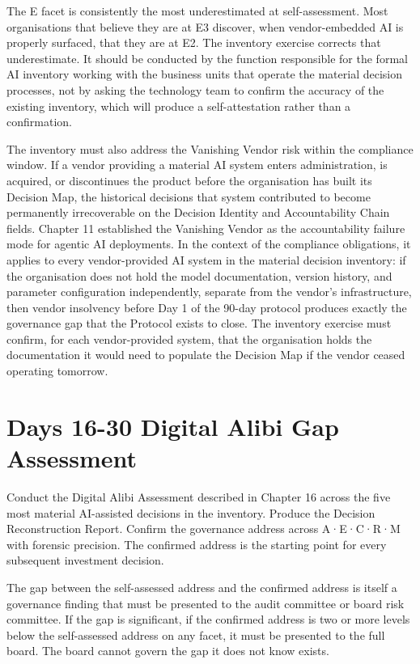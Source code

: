 The E facet is consistently the most underestimated at self-assessment. Most organisations that believe they are at E3 discover, when vendor-embedded AI is properly surfaced, that they are at E2. The inventory exercise corrects that underestimate. It should be conducted by the function responsible for the formal AI inventory working with the business units that operate the material decision processes, not by asking the technology team to confirm the accuracy of the existing inventory, which will produce a self-attestation rather than a confirmation.

The inventory must also address the Vanishing Vendor risk within the compliance window. If a vendor providing a material AI system enters administration, is acquired, or discontinues the product before the organisation has built its Decision Map, the historical decisions that system contributed to become permanently irrecoverable on the Decision Identity and Accountability Chain fields. Chapter 11 established the Vanishing Vendor as the accountability failure mode for agentic AI deployments. In the context of the compliance obligations, it applies to every vendor-provided AI system in the material decision inventory: if the organisation does not hold the model documentation, version history, and parameter configuration independently, separate from the vendor's infrastructure, then vendor insolvency before Day 1 of the 90-day protocol produces exactly the governance gap that the Protocol exists to close. The inventory exercise must confirm, for each vendor-provided system, that the organisation holds the documentation it would need to populate the Decision Map if the vendor ceased operating tomorrow.

\section{Days 16-30 Digital Alibi Gap Assessment}

Conduct the Digital Alibi Assessment described in Chapter 16 across the five most material AI-assisted decisions in the inventory. Produce the Decision Reconstruction Report. Confirm the governance address across A·E·C·R·M with forensic precision. The confirmed address is the starting point for every subsequent investment decision.

The gap between the self-assessed address and the confirmed address is itself a governance finding that must be presented to the audit committee or board risk committee. If the gap is significant, if the confirmed address is two or more levels below the self-assessed address on any facet, it must be presented to the full board. The board cannot govern the gap it does not know exists.

